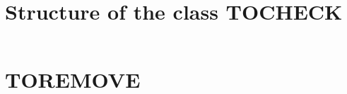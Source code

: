 \chapter{Structure of the class TOCHECK}

\inputminted[showtabs=false, linenos=false,frame=leftline]{java}{"./java/structure.java"}



\chapter{TOREMOVE}
	\inputminted{java}{"./java/SecurityMechanismSelector.java"}












